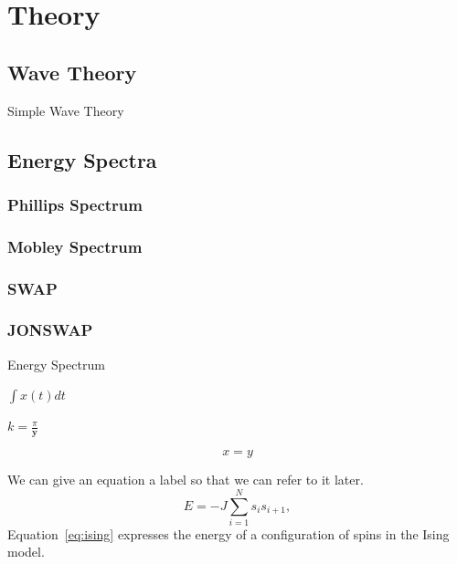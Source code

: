 \chapter{Theory}
\label{Theory}

\section{Wave Theory}

Simple Wave Theory

\section{Energy Spectra}

\subsection{Phillips Spectrum}
\subsection{Mobley Spectrum}
\subsection{SWAP}
\subsection{JONSWAP}


Energy Spectrum

$\int x(t) dt$

$k=\frac{\pi}{\mathbf y}$

\begin{equation}\label{eq:test} x = y \end{equation}

We can give an equation a label so that we can refer to it later.
\begin{equation}
\label{eq:ising}
E = -J \sum_{i=1}^N s_i s_{i+1} ,
\end{equation}
Equation~\eqref{eq:ising} expresses the energy of a configuration
of spins in the Ising model.


